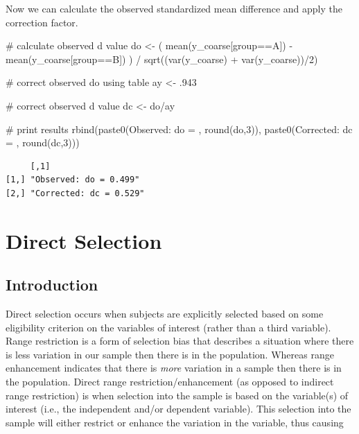 \documentclass[
  letterpaper,
  DIV=11,
  numbers=noendperiod]{scrreprt}
\newenvironment{Shaded}{\begin{snugshade}}{\end{snugshade}}
\newcommand{\CommentTok}[1]{\textcolor[rgb]{0.37,0.37,0.37}{#1}}
\newcommand{\DecValTok}[1]{\textcolor[rgb]{0.68,0.00,0.00}{#1}}
\newcommand{\FunctionTok}[1]{\textcolor[rgb]{0.28,0.35,0.67}{#1}}
\newcommand{\NormalTok}[1]{\textcolor[rgb]{0.00,0.23,0.31}{#1}}
\newcommand{\OtherTok}[1]{\textcolor[rgb]{0.00,0.23,0.31}{#1}}
\newcommand{\SpecialCharTok}[1]{\textcolor[rgb]{0.37,0.37,0.37}{#1}}
\newcommand{\StringTok}[1]{\textcolor[rgb]{0.13,0.47,0.30}{#1}}
\begin{document}
Now we can calculate the observed standardized mean difference and apply
the correction factor.

\begin{Shaded}
\begin{Highlighting}[]
\CommentTok{\# calculate observed d value}
\NormalTok{do }\OtherTok{\textless{}{-}}\NormalTok{ ( }\FunctionTok{mean}\NormalTok{(y\_coarse[group}\SpecialCharTok{==}\StringTok{\textquotesingle{}A\textquotesingle{}}\NormalTok{]) }\SpecialCharTok{{-}} \FunctionTok{mean}\NormalTok{(y\_coarse[group}\SpecialCharTok{==}\StringTok{\textquotesingle{}B\textquotesingle{}}\NormalTok{]) ) }\SpecialCharTok{/} \FunctionTok{sqrt}\NormalTok{((}\FunctionTok{var}\NormalTok{(y\_coarse) }\SpecialCharTok{+} \FunctionTok{var}\NormalTok{(y\_coarse))}\SpecialCharTok{/}\DecValTok{2}\NormalTok{)}

\CommentTok{\# correct observed do using table}
\NormalTok{ay }\OtherTok{\textless{}{-}}\NormalTok{ .}\DecValTok{943}

\CommentTok{\# correct observed d value}
\NormalTok{dc }\OtherTok{\textless{}{-}}\NormalTok{ do}\SpecialCharTok{/}\NormalTok{ay}

\CommentTok{\# print results}
\FunctionTok{rbind}\NormalTok{(}\FunctionTok{paste0}\NormalTok{(}\StringTok{\textquotesingle{}Observed: do = \textquotesingle{}}\NormalTok{, }\FunctionTok{round}\NormalTok{(do,}\DecValTok{3}\NormalTok{)),}
      \FunctionTok{paste0}\NormalTok{(}\StringTok{\textquotesingle{}Corrected: dc = \textquotesingle{}}\NormalTok{, }\FunctionTok{round}\NormalTok{(dc,}\DecValTok{3}\NormalTok{)))}
\end{Highlighting}
\end{Shaded}

\begin{verbatim}
     [,1]                   
[1,] "Observed: do = 0.499" 
[2,] "Corrected: dc = 0.529"
\end{verbatim}

\hypertarget{sec-direct_range_restriction}{%
\chapter{Direct Selection}\label{sec-direct_range_restriction}}

\hypertarget{introduction-5}{%
\section{Introduction}\label{introduction-5}}

Direct selection occurs when subjects are explicitly selected based on
some eligibility criterion on the variables of interest (rather than a
third variable). Range restriction is a form of selection bias that
describes a situation where there is less variation in our sample then
there is in the population. Whereas range enhancement indicates that
there is \emph{more} variation in a sample then there is in the
population. Direct range restriction/enhancement (as opposed to indirect
range restriction) is when selection into the sample is based on the
variable(s) of interest (i.e., the independent and/or dependent
variable). This selection into the sample will either restrict or
enhance the variation in the variable, thus causing
\end{document}

